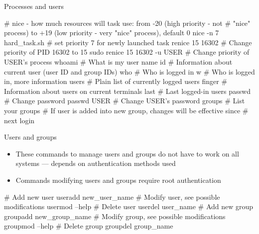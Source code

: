 \documentclass[compress, xelatex, 11pt, xcolor=svgnames, aspectratio=169, url={hyphens, lowtilde}]{beamer}
\begin{document}
\begin{frame}[fragile]{Processes and users}
	\begin{bashcode}
    # nice - how much resources will task use: from -20 (high priority - not
    # "nice" process) to +19 (low priority - very "nice" process), default 0
    nice -n 7 hard_task.sh # set priority 7 for newly launched task
    renice 15 16302 # Change priority of PID 16302 to 15
    sudo renice 15 16302 -u USER # Change priority of USER's process
    whoami # What is my user name
    id # Information about current user (user ID and group IDs)
    who # Who is logged in
    w # Who is logged in, more information
    users # Plain list of currently logged users
    finger # Information about users on current terminals
    last # Last logged-in users
    passwd # Change password
    passwd USER # Change USER's password
    groups # List your groups
    # If user is added into new group, changes will be effective since
    # next login
	\end{bashcode}
\end{frame}

\begin{frame}[fragile]{Users and groups}
	\begin{itemize}
		\item These commands to manage users and groups do not have to work on all systems --- depends on authentication methods used
		\item Commands modifying users and groups require root authentication
	\end{itemize}
	\begin{bashcode}
    # Add new user
    useradd new_user_name
    # Modify user, see possible modifications
    usermod --help
    # Delete user
    userdel user_name
    # Add new group
    groupadd new_group_name
    # Modify group, see possible modifications
    groupmod --help
    # Delete group
    groupdel group_name
	\end{bashcode}
\end{frame}
\end{document}

